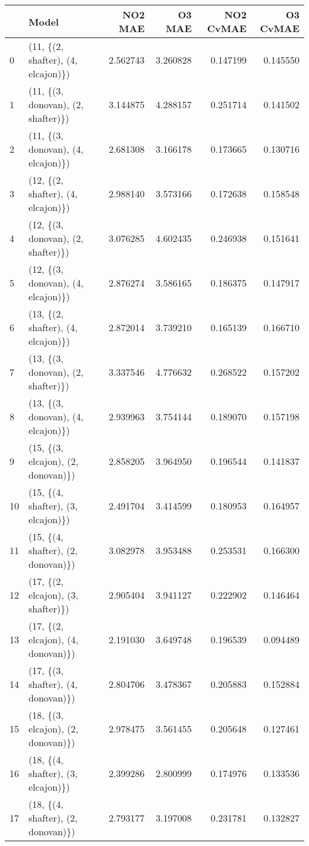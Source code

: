 \begin{tabular}{llrrrr}
\toprule
{} &                               Model &   NO2 MAE &    O3 MAE &  NO2 CvMAE &  O3 CvMAE \\
\midrule
0  &  (11, \{(2, shafter), (4, elcajon)\}) &  2.562743 &  3.260828 &   0.147199 &  0.145550 \\
1  &  (11, \{(3, donovan), (2, shafter)\}) &  3.144875 &  4.288157 &   0.251714 &  0.141502 \\
2  &  (11, \{(3, donovan), (4, elcajon)\}) &  2.681308 &  3.166178 &   0.173665 &  0.130716 \\
3  &  (12, \{(2, shafter), (4, elcajon)\}) &  2.988140 &  3.573166 &   0.172638 &  0.158548 \\
4  &  (12, \{(3, donovan), (2, shafter)\}) &  3.076285 &  4.602435 &   0.246938 &  0.151641 \\
5  &  (12, \{(3, donovan), (4, elcajon)\}) &  2.876274 &  3.586165 &   0.186375 &  0.147917 \\
6  &  (13, \{(2, shafter), (4, elcajon)\}) &  2.872014 &  3.739210 &   0.165139 &  0.166710 \\
7  &  (13, \{(3, donovan), (2, shafter)\}) &  3.337546 &  4.776632 &   0.268522 &  0.157202 \\
8  &  (13, \{(3, donovan), (4, elcajon)\}) &  2.939963 &  3.754144 &   0.189070 &  0.157198 \\
9  &  (15, \{(3, elcajon), (2, donovan)\}) &  2.858205 &  3.964950 &   0.196544 &  0.141837 \\
10 &  (15, \{(4, shafter), (3, elcajon)\}) &  2.491704 &  3.414599 &   0.180953 &  0.164957 \\
11 &  (15, \{(4, shafter), (2, donovan)\}) &  3.082978 &  3.953488 &   0.253531 &  0.166300 \\
12 &  (17, \{(2, elcajon), (3, shafter)\}) &  2.905404 &  3.941127 &   0.222902 &  0.146464 \\
13 &  (17, \{(2, elcajon), (4, donovan)\}) &  2.191030 &  3.649748 &   0.196539 &  0.094489 \\
14 &  (17, \{(3, shafter), (4, donovan)\}) &  2.804706 &  3.478367 &   0.205883 &  0.152884 \\
15 &  (18, \{(3, elcajon), (2, donovan)\}) &  2.978475 &  3.561455 &   0.205648 &  0.127461 \\
16 &  (18, \{(4, shafter), (3, elcajon)\}) &  2.399286 &  2.800999 &   0.174976 &  0.133536 \\
17 &  (18, \{(4, shafter), (2, donovan)\}) &  2.793177 &  3.197008 &   0.231781 &  0.132827 \\

\end{tabular}
